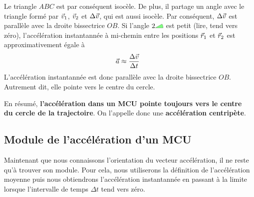 \documentclass{tufte-handout}
\begin{document}
Le triangle $ABC$ est par conséquent isocèle.  De plus, il partage un angle
avec le triangle formé par $\vec{v}_1$, $\vec{v}_2$ et $\Delta \vec{v}$, qui est aussi
isocèle.  Par conséquent, $\Delta \vec{v}$ est parallèle avec la droite bissectrice
$OB$.  Si l'angle $2\tikz{\filldraw[fill=green, opacity=0.5] (0, 0) -- (0.4, 0)
  arc (0:30:0.4) -- cycle;}$ est petit (lire, tend vers zéro), l'accélération
instantannée à mi-chemin entre les positions $\vec{r}_1$ et $\vec{r}_2$ est
approximativement égale à
\[
  \vec{a} \approx \frac{\Delta \vec{v}}{\Delta t} 
\]
L'accélération instantannée est donc parallèle avec la droite bissectrice $OB$.
Autrement dit, elle pointe vers le centre du cercle.

En résumé, \textbf{l'accélération dans un MCU pointe toujours vers le centre du
cercle de la trajectoire}.  On l'appelle donc une \textbf{accélération
centripète}.



\subsection{Module de l'accélération d'un MCU}

Maintenant que nous connaissons l'orientation du vecteur accélération, il ne reste
qu'à trouver son module.  Pour cela, nous utiliserons la définition de
l'accélération moyenne puis nous obtiendrons l'accélération instantannée en
passant à la limite lorsque l'intervalle de temps $\Delta t$ tend vers zéro.
\end{document}
